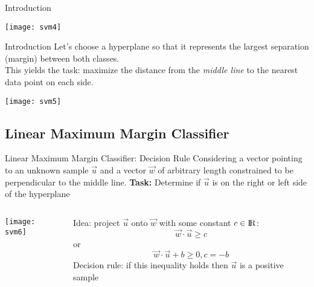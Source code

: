\documentclass{beamer}
\begin{document}
\begin{frame}{Introduction}
\begin{center}
\texttt{[image: svm4]}
\end{center}
\end{frame}


\begin{frame}{Introduction}
Let's choose a hyperplane so that it represents the largest separation (margin) between both classes. \\This yields the task: maximize the distance from the \textit{middle line} to the nearest data point on each side.
\begin{center}
\texttt{[image: svm5]}
\end{center}
\end{frame}

\subsection{Linear Maximum Margin Classifier}
\begin{frame}{Linear Maximum Margin Classifier: Decision Rule}
Considering a vector pointing to an unknown sample $\vec{u}$ and a vector $\vec{w}$ of arbitrary length constrained to be perpendicular to the middle line. \textbf{Task:} Determine if $\vec{u}$ is on the right or left side of the hyperplane
 \vspace{2em}

\begin{columns}
    \begin{column}{0.5\textwidth}
        \texttt{[image: svm6]}
    \end{column}
    \begin{column}{0.5\textwidth}
        Idea: project $\vec{u}$ onto $\vec{w}$ with some constant $c \in {\rm I\!R}$:\\ $$\vec{w}\cdot\vec{u} \geq c$$ or
        $$\vec{w}\cdot\vec{u}+b \geq 0, c = -b$$
        Decision rule: if this inequality holds then $\vec{u}$ is a positive sample
    \end{column}
\end{columns}
\end{frame}
\end{document}
